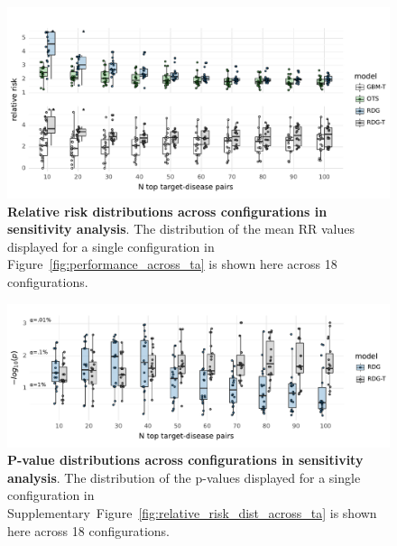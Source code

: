 \documentclass{article}
\begin{document}
\begin{figure}
  \centering
  \captionsetup{width=.9\linewidth}
  \includegraphics[width=1\textwidth]{sensitivity_relative_risk.pdf}
  \caption{
    \textbf{Relative risk distributions across configurations in sensitivity analysis}.
    The distribution of the mean RR values displayed for a single configuration in Figure~\ref{fig:performance_across_ta} is shown here across 18 configurations.
  }
  \label{fig:sensitivity_relative_risk}
\end{figure}

\begin{figure}
  \centering
  \captionsetup{width=.9\linewidth}
  \includegraphics[width=1\textwidth]{sensitivity_p_values.pdf}
  \caption{
    \textbf{P-value distributions across configurations in sensitivity analysis}.
    The distribution of the p-values displayed for a single configuration in Supplementary~Figure~\ref{fig:relative_risk_dist_across_ta} is shown here across 18 configurations.
  }
  \label{fig:sensitivity_p_values}
\end{figure}


  
 
\end{document}
